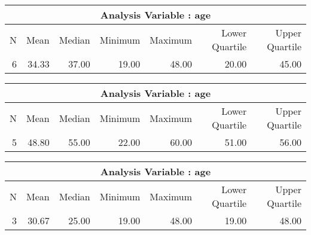 \documentclass[10pt]{article}
\begin{document}

\pagebreak




\begin{longtable}{|r|r|r|r|r|r|r|}\hline
   \multicolumn{7}{|c|}{Analysis Variable : age }\\\hline
   N &    Mean &    Median &    Minimum &    Maximum &    Lower Quartile &    Upper Quartile\\\hline
\endhead
   6 &    34.33 &    37.00 &    19.00 &    48.00 &    20.00 &    45.00\\\hline
\end{longtable}




\begin{longtable}{|r|r|r|r|r|r|r|}\hline
   \multicolumn{7}{|c|}{Analysis Variable : age }\\\hline
   N &    Mean &    Median &    Minimum &    Maximum &    Lower Quartile &    Upper Quartile\\\hline
\endhead
   5 &    48.80 &    55.00 &    22.00 &    60.00 &    51.00 &    56.00\\\hline
\end{longtable}




\begin{longtable}{|r|r|r|r|r|r|r|}\hline
   \multicolumn{7}{|c|}{Analysis Variable : age }\\\hline
   N &    Mean &    Median &    Minimum &    Maximum &    Lower Quartile &    Upper Quartile\\\hline
\endhead
   3 &    30.67 &    25.00 &    19.00 &    48.00 &    19.00 &    48.00\\\hline
\end{longtable}


\end{document}
